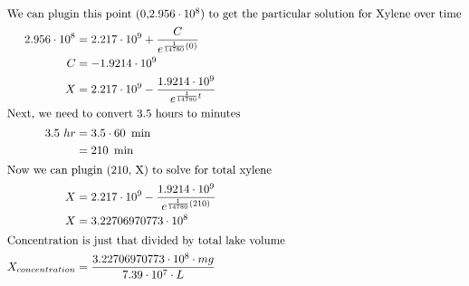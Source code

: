 \documentclass[12pt]{article}
\begin{document}
\begin{align}
  \intertext{We can plugin this point (0,$2.956\cdot10^{8}$) to get the particular solution for Xylene over time}
  2.956\cdot10^{8}                                                                         & =2.217\cdot10^{9}+\frac{C}{e^{\frac{1}{14780}\left(0\right)}}                                                                                                             \\
  C                                                                                        & =-1.9214\cdot10^{9}                                                                                                                                                       \\
  X                                                                                        & =2.217\cdot10^{9}-\frac{1.9214\cdot10^{9}}{e^{\frac{1}{14780}t}}                                                                                                          \\
  \intertext{Next, we need to convert 3.5 hours to minutes}
  3.5\ hr                                                                                  & =3.5\cdot60\ \min                                                                                                                                                         \\
                                                                                           & =210\ \min                                                                                                                                                                \\
  \intertext{Now we can plugin (210, X) to solve for total xylene}
  X                                                                                        & =2.217\cdot10^{9}-\frac{1.9214\cdot10^{9}}{e^{\frac{1}{14780}\left(210\right)}}                                                                                           \\
  X                                                                                        & =3.22706970773\cdot10^{8}                                                                                                                                                 \\
  \intertext{Concentration is just that divided by total lake volume}
  X_{concentration}                                                                        & =\frac{3.22706970773\cdot10^{8}\cdot mg}{7.39\cdot10^{7}\cdot L}                                                                                                          \\

\end{align}
\end{document}
